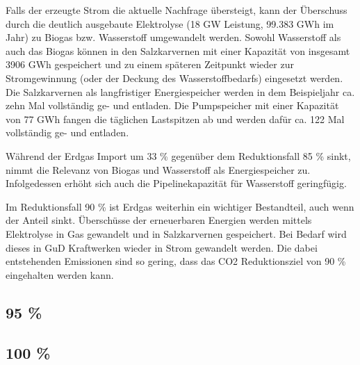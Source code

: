 
Falls der erzeugte Strom die aktuelle Nachfrage übersteigt, kann der Überschuss durch die deutlich ausgebaute Elektrolyse (18 GW Leistung, 99.383 GWh im Jahr) zu Biogas bzw. Wasserstoff umgewandelt werden. Sowohl Wasserstoff als auch das Biogas können in den Salzkarvernen mit einer Kapazität von insgesamt 3906 GWh gespeichert und zu einem späteren Zeitpunkt wieder zur Stromgewinnung (oder der Deckung des Wasserstoffbedarfs) eingesetzt werden. Die Salzkarvernen als langfristiger Energiespeicher werden in dem Beispieljahr ca. zehn Mal vollständig ge- und entladen. Die Pumpspeicher mit einer Kapazität von 77 GWh fangen die täglichen Lastspitzen ab und werden dafür ca. 122 Mal vollständig ge- und entladen.

Während der Erdgas Import um 33 \% gegenüber dem Reduktionsfall 85 \% sinkt, nimmt die Relevanz von Biogas und Wasserstoff als Energiespeicher zu. Infolgedessen erhöht sich auch die Pipelinekapazität für Wasserstoff geringfügig. 

Im Reduktionsfall 90 \% ist Erdgas weiterhin ein wichtiger Bestandteil, auch wenn der Anteil sinkt. Überschüsse der erneuerbaren Energien werden mittels Elektrolyse in Gas gewandelt und in Salzkarvernen gespeichert. Bei Bedarf wird dieses in GuD Kraftwerken wieder in Strom gewandelt werden. Die dabei entstehenden Emissionen sind so gering, dass das CO2 Reduktionsziel von 90 \% eingehalten werden kann. 

\subsection{95 \%}

\subsection{100 \%}
%
